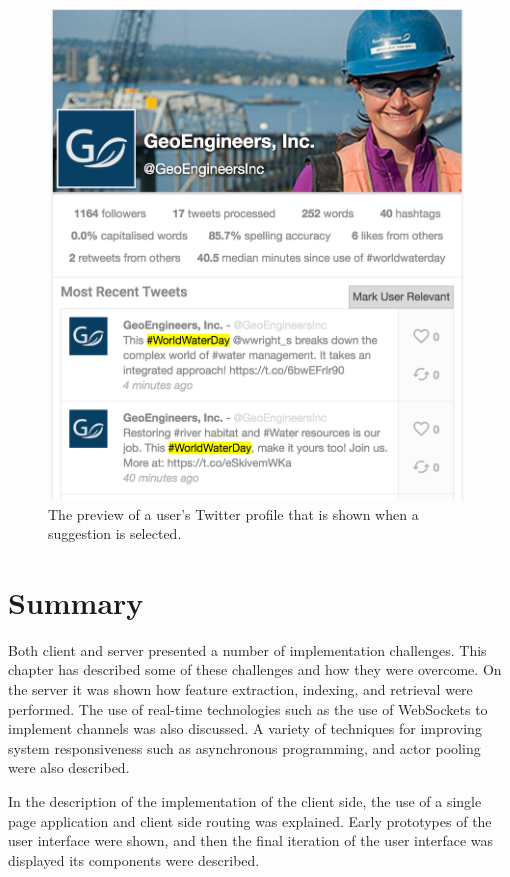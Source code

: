 \documentclass{l4proj}
\begin{document}
\begin{figure}
\centering
\includegraphics[scale=0.5]{userpreview.png}
\caption{The preview of a user's Twitter profile that is shown when a suggestion is selected.}
\label{userpreview}
\end{figure}         
        
        
    \section{Summary}
    Both client and server presented a number of implementation challenges. This chapter has described some of these challenges and how they were overcome. On the server it was shown how feature extraction, indexing, and retrieval were performed. The use of real-time technologies such as the use of WebSockets to implement channels was also discussed. A variety of techniques for improving system responsiveness such as asynchronous programming, and actor pooling were also described.
    
    In the description of the implementation of the client side, the use of a single page application and client side routing was explained. Early prototypes of the user interface were shown, and then the final iteration of the user interface was displayed its components were described.        
        
\end{document}
